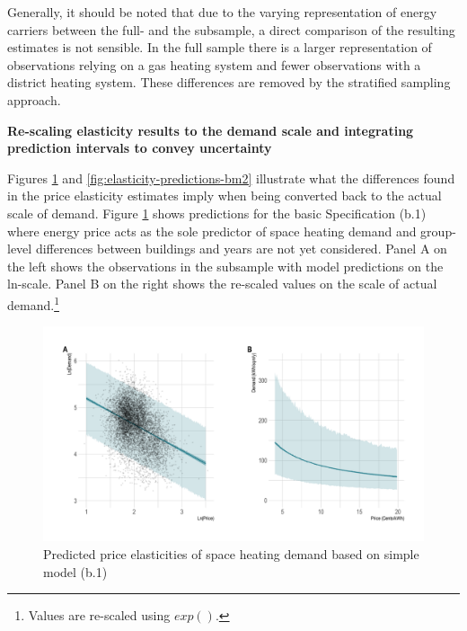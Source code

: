 \documentclass[12pt,twoside]{reedthesis}
\begin{document}
Generally, it should be noted that due to the varying representation of energy carriers between the full- and the subsample, a direct comparison of the resulting estimates is not sensible. In the full sample there is a larger representation of observations relying on a gas heating system and fewer observations with a district heating system. These differences are removed by the stratified sampling approach.

\textbf{Re-scaling elasticity results to the demand scale and integrating prediction intervals to convey uncertainty}

Figures \ref{fig:elasticity-predictions-b1} and \ref{fig:elasticity-predictions-bm2} illustrate what the differences found in the price elasticity estimates imply when being converted back to the actual scale of demand. Figure \ref{fig:elasticity-predictions-b1} shows predictions for the basic Specification (b.1) where energy price acts as the sole predictor of space heating demand and group-level differences between buildings and years are not yet considered. Panel A on the left shows the observations in the subsample with model predictions on the ln-scale. Panel B on the right shows the re-scaled values on the scale of actual demand.\footnote{Values are re-scaled using \(exp()\).}
\begin{figure}

{\centering \includegraphics[width=1\linewidth]{figure/b1_prediction} 

}

\caption{Predicted price elasticities of space heating demand based on simple model (b.1)}\label{fig:elasticity-predictions-b1}
\end{figure}
\end{document}
